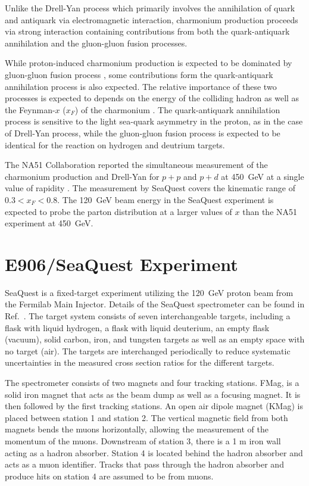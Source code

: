 \documentclass[10pt,a4paper,final]{article}
\begin{document}
Unlike the Drell-Yan process which primarily involves the annihilation of quark
and antiquark via electromagnetic interaction, charmonium production proceeds
via strong interaction containing contributions from both the quark-antiquark
annihilation and the gluon-gluon fusion processes.

While proton-induced charmonium production is expected to be dominated by gluon-gluon
fusion process \cite{vogt1999}, some contributions form the quark-antiquark
annihilation process is also expected. The relative importance of these two
processes is expected to depends on the energy of the colliding hadron as well
as the Feynman-$x$ ($x_F$) of the charmonium \cite{peng1995}. The quark-antiquark
annihilation process is sensitive to the light sea-quark asymmetry in the proton,
as in the case of Drell-Yan process, while the gluon-gluon fusion process is expected 
to be identical for the reaction on hydrogen and deutrium targets. 

The NA51 Collaboration reported the simultaneous measurement of the charmonium
production and Drell-Yan for $p+p$ and $p+d$ at \SI{450}{\GeV} at a single value
of rapidity \cite{abreu1998}. The measurement by SeaQuest covers the kinematic
range of $0.3<x_F<0.8$. The \SI{120}{\GeV} beam energy in the SeaQuest experiment
is expected to probe the parton distribution at a larger values of $x$ than the
NA51 experiment at \SI{450}{\GeV}.


\section{E906/SeaQuest Experiment}
\label{sec:e906}
SeaQuest is a fixed-target experiment utilizing the \SI{120}{\GeV} proton beam
from the Fermilab Main Injector. Details of the SeaQuest spectrometer can be
found in Ref.~\cite{aidala2019}. The target system consists of seven
interchangeable targets, including a flask with liquid hydrogen, a flask with
liquid deuterium, an empty flask (vacuum), solid carbon, iron, and tungsten
targets as well as an empty space with no target (air). The targets are interchanged
periodically to reduce systematic uncertainties in the measured cross section
ratios for the different targets.

The spectrometer consists of two magnets and four tracking stations. FMag, is a
solid iron magnet that acts as the beam dump as well as a focusing magnet. It is
then followed by the first tracking stations. An open air dipole magnet (KMag) is
placed between station 1 and station 2. The vertical magnetic field from both
magnets bends the muons horizontally, allowing the measurement of the momentum
of the muons. Downstream of station 3, there is a 1 m iron wall acting as a
hadron absorber. Station 4 is located behind the hadron absorber and acts as a
muon identifier. Tracks that pass through the hadron absorber and
produce hits on station 4 are assumed to be from muons.
\end{document}
